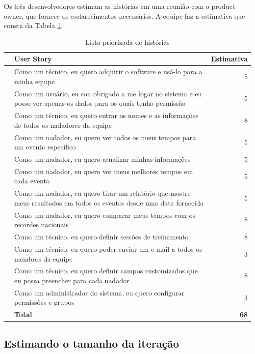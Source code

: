 \documentclass[a4paper,abntfigtabnum,noindentfirst]{abnt}
\begin{document}
Os três desenvolvedores estimam as histórias em uma reunião com o product owner, que fornece os esclarecimentos necessários. A equipe faz a estimativa que consta da Tabela \ref{tabela-com-as-estimativas}.

\begin{table}
  \caption{Lista priorizada de histórias}
  \label{tabela-com-as-estimativas}
  \begin{center}
    \begin{tabular}{clr}
      \hline
      &\textbf{User Story}&\textbf{Estimativa}\\
      \hline
      &Como um técnico, eu quero adquirir o software e usá-lo para a minha equipe&5\\
      &Como um usuário, eu sou obrigado a me logar no sistema e eu posso ver apenas os dados para os quais tenho permissão&5\\
      &Como um técnico, eu quero entrar os nomes e as informações de todos os nadadores da equipe&8\\
      &Como um nadador, eu quero ver todos os meus tempos para um evento específico&5\\
      &Como um nadador, eu quero atualizar minhas informações&5\\
      &Como um nadador, eu quero ver meus melhores tempos em cada evento&5\\
      &Como um nadador, eu quero tirar um relatório que mostre meus resultados em todos os eventos desde uma data fornecida&5\\
      &Como um nadador, eu quero comparar meus tempos com os recordes nacionais&8\\
      &Como um técnico, eu quero definir sessões de treinamento&8\\
      &Como um técnico, eu quero poder enviar um e-mail a todos os membros da equipe&3\\
      &Como um técnico, eu quero definir campos customizados que eu possa preencher para cada nadador&8\\
      &Como um administrador do sistema, eu quero configurar permissões e grupos&3\\
      \hline
      &\textbf{Total}&\textbf{68}\\
      \hline
    \end{tabular}
  \end{center}
\end{table}

\subsection{Estimando o tamanho da iteração}
\end{document}
